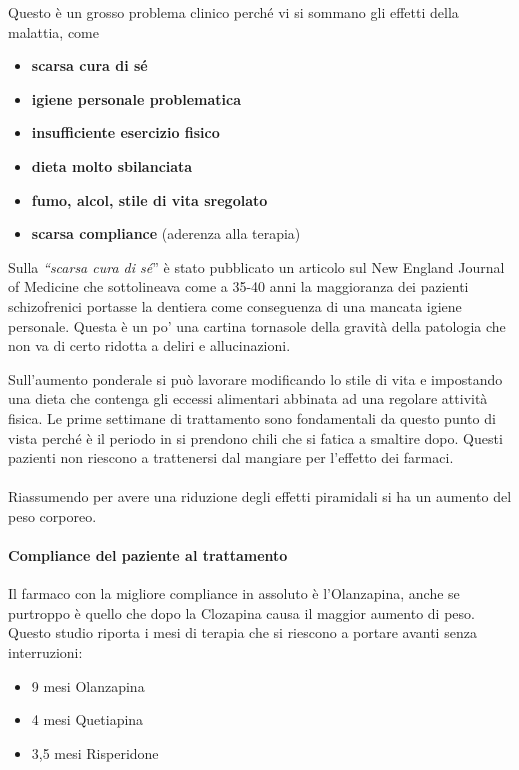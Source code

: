 Questo è un grosso problema clinico perché vi si sommano gli effetti
della malattia, come

\begin{itemize}
\item
  \textbf{scarsa cura di sé}
\item
  \textbf{igiene personale problematica}
\item
  \textbf{insufficiente esercizio fisico }
\item
  \textbf{dieta molto sbilanciata}
\item
  \textbf{fumo, alcol, stile di vita sregolato }
\item
  \textbf{scarsa compliance} (aderenza alla terapia)
\end{itemize}

Sulla \emph{``scarsa cura di sé}'' è stato pubblicato un articolo sul
New England Journal of Medicine che sottolineava come a 35-40 anni la
maggioranza dei pazienti schizofrenici portasse la dentiera come
conseguenza di una mancata igiene personale. Questa è un po' una cartina
tornasole della gravità della patologia che non va di certo ridotta a
deliri e allucinazioni.

Sull'aumento ponderale si può lavorare modificando lo stile di vita e
impostando una dieta che contenga gli eccessi alimentari abbinata ad una
regolare attività fisica. Le prime settimane di trattamento sono
fondamentali da questo punto di vista perché è il periodo in si prendono
chili che si fatica a smaltire dopo. Questi pazienti non riescono a
trattenersi dal mangiare per l'effetto dei farmaci.
\\\\
Riassumendo per avere una riduzione degli effetti piramidali si ha un
aumento del peso corporeo.

\paragraph{Compliance del paziente al trattamento}

Il farmaco con la migliore compliance in assoluto è l'Olanzapina, anche
se purtroppo è quello che dopo la Clozapina causa il maggior aumento di
peso. Questo studio riporta i mesi di terapia che si riescono a portare
avanti senza interruzioni:

\begin{itemize}
\item
  9 mesi Olanzapina
\item
  4 mesi Quetiapina
\item
  3,5 mesi Risperidone
\end{itemize}

